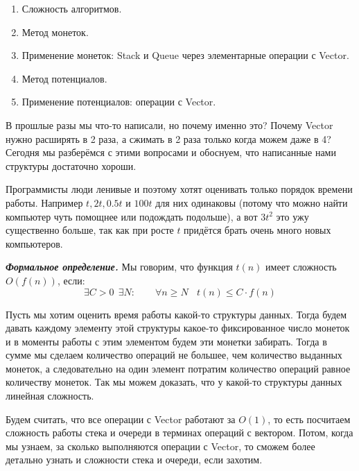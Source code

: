 \label{md2tex5}
\hyperref[md2texREADME]{\color{cyan}{К главному описанию}}


\begin{enumerate}
    \item Сложность алгоритмов.
    \item Метод монеток.
    \item Применение монеток: Stack и Queue через элементарные операции с Vector.
    \item Метод потенциалов.
    \item Применение потенциалов: операции с Vector.
\end{enumerate}


В прошлые разы мы что-то написали, но почему именно это? Почему Vector нужно расширять в 2 раза, а сжимать в 2 раза только когда можем даже в 4? Сегодня мы разберёмся с этими вопросами и обоснуем, что написанные нами структуры достаточно хороши.


Программисты люди ленивые и поэтому хотят оценивать только порядок времени работы. Например $t, 2t, 0.5t$ и $100t$ для них одинаковы (потому что можно найти компьютер чуть помощнее или подождать подольше), а вот $3t^2$ это ужу существенно больше, так как при росте $t$ придётся брать очень много новых компьютеров.

\textbf{\textit{Формальное определение.}} Мы говорим, что функция $t(n)$ имеет сложность $O(f(n))$, если:
$$\exists C > 0\ \ \exists N: \qquad \forall n \geq N \ \ \ \ t(n) \leq C \cdot f(n)$$


Пусть мы хотим оценить время работы какой-то структуры данных. Тогда будем давать каждому элементу этой структуры какое-то фиксированное число монеток и в моменты работы с этим элементом будем эти монетки забирать. Тогда в сумме мы сделаем количество операций не большее, чем количество выданных монеток, а следовательно на один элемент потратим количество операций равное количеству монеток. Так мы можем доказать, что у какой-то структуры данных линейная сложность.


Будем считать, что все операции с Vector работают за $O(1)$, то есть посчитаем сложность работы стека и очереди в терминах операций с вектором. Потом, когда мы узнаем, за сколько выполняются операции с Vector, то сможем более детально узнать и сложности стека и очереди, если захотим.

